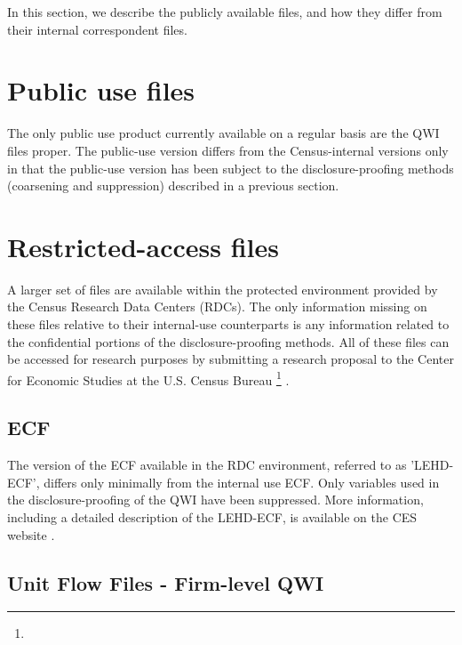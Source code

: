 
%


In this section, we describe the publicly available files, and how they
differ from their internal correspondent files.


\section{Public use files}
\label{sec:public:public-use}

The only public use product currently available on a regular basis are the
QWI files proper. The public-use version differs from the Census-internal
versions only in that the public-use version has been subject to the
disclosure-proofing methods (coarsening and suppression) described in a
previous section. 


\section{Restricted-access files}
\label{sec:public:restricted}

A larger set of files are available within the protected environment
provided by the Census Research Data Centers (RDCs). The only information
missing on these files relative to their internal-use counterparts is any
information related to the confidential portions of the disclosure-proofing
methods. All of these files can be accessed for research purposes by
submitting a research proposal to the Center for Economic Studies at the
U.S. Census Bureau%
%
\footnote{}%
%
.


\subsection{ECF}
\label{sec:LEHD-ECF}

The version of the ECF available in the RDC environment, referred to as
'LEHD-ECF', differs only minimally from the internal
use ECF. Only variables used in the disclosure-proofing of the QWI have
been suppressed. More information, including a detailed description of the
LEHD-ECF, is available on the CES
website \citep{ip-lehd-ecf}.

\subsection{Unit Flow Files - Firm-level QWI}
\label{sec:LEHD-QWI}

